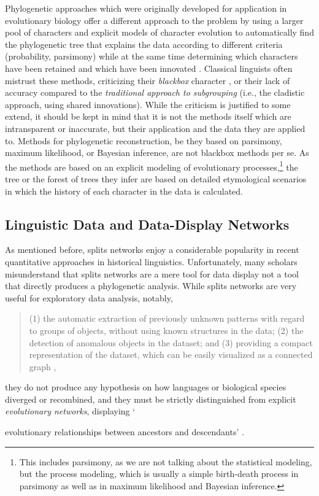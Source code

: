 \documentclass[svgnames,12pt]{scrartcl}
\begin{document}
{Phylogenetic approaches which were originally developed for application in evolutionary biology
offer a different approach to the problem by using a larger pool of characters and explicit models
of character evolution to automatically find the phylogenetic tree that explains the data according
to different criteria (probability, parsimony) while at the same time determining which characters
have been retained and which have been innovated \citep{Greenhill2012}. Classical linguists often
mistrust these methods, criticizing their \emph{blackbox} character \citep{Prokic2013}, or their
lack of
accuracy \citep{Holm2007} compared to the \emph{traditional approach to subgrouping} (i.e., the
cladistic approach, using shared innovations). While the criticism is justified to some extend, it
should be kept in mind that it is not the methods itself which are intransparent or inaccurate, but
their application and the data they are applied to.
Methods for phylogenetic reconstruction, be they based on parsimony, maximum likelihood, or Bayesian
inference, are not blackbox methods per se. As the methods are based on an explicit modeling of
evolutionary processes,\footnote{This includes parsimony, as we are not talking about the
statistical modeling, but the process modeling, which is usually a simple birth-death process in
parsimony as well as in maximum likelihood and Bayesian inference.} the tree or the forest of trees
they infer are based on detailed etymological scenarios in which the history of each character in
the data is calculated. 

\subsection{Linguistic Data and Data-Display Networks}
As mentioned before, splits networks enjoy a considerable popularity in recent quantitative approaches
in historical linguistics.
Unfortunately, many scholars misunderstand
that splits networks are a mere tool for data display \citep{Morrison2010} not a tool that directly
produces a phylogenetic analysis. While splits
networks are very useful for exploratory data analysis, notably, 
\begin{quote}
(1) the automatic extraction of previously unknown patterns with regard to groups of
objects, without using known structures in the data;
(2) the detection of anomalous objects in the dataset;
and (3) providing a compact representation of the
dataset, which can be easily visualized as a connected
graph \citep[2]{Morrison2014b},
\end{quote}
they do not produce any hypothesis on how languages or biological species diverged or recombined, and they must be
strictly distinguished from explicit \emph{evolutionary networks}, displaying `{evolutionary
relationships between ancestors and descendants' \citep[43]{Morrison2011}.
 
}}
\end{document}
